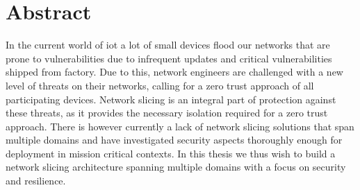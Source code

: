 \chapter*{\centering Abstract}
In the current world of \acrshort{iot} a lot of small devices flood our networks that are prone to vulnerabilities due to infrequent updates and critical vulnerabilities shipped from factory. Due to this, network engineers are challenged with a new level of threats on their networks, calling for a zero trust approach of all participating devices. Network slicing is an integral part of protection against these threats, as it provides the necessary isolation required for a zero trust approach. There is however currently a lack of network slicing solutions that span multiple domains and have investigated security aspects thoroughly enough for deployment in mission critical contexts. In this thesis we thus wish to build a network slicing architecture spanning multiple domains with a focus on security and resilience.